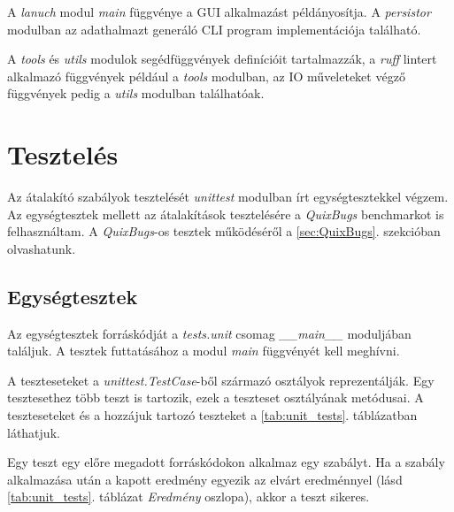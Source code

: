 A \emph{lanuch} modul \emph{main} függvénye a GUI alkalmazást példányosítja.
A \emph{persistor} modulban az adathalmazt generáló CLI program implementációja található.

A \emph{tools} és \emph{utils} modulok segédfüggvények definícióit tartalmazzák,
a \emph{ruff} lintert alkalmazó függvények például a \emph{tools} modulban,
az IO műveleteket végző függvények pedig a \emph{utils} modulban találhatóak.

\pagebreak

\section{Tesztelés}

Az átalakító szabályok tesztelését \emph{unittest} modulban írt egységtesztekkel végzem.
Az egységtesztek mellett az átalakítások tesztelésére a \emph{QuixBugs}
benchmarkot \cite{QuixBugs} is felhasználtam.
A \emph{QuixBugs}-os tesztek működéséről a \ref{sec:QuixBugs}. szekcióban olvashatunk.

\subsection{Egységtesztek}

Az egységtesztek forráskódját a \emph{tests.unit} csomag \emph{\_\_main\_\_}
moduljában találjuk. A tesztek futtatásához a modul \emph{main} függvényét kell meghívni.

A teszteseteket a \emph{unittest.TestCase}-ből származó osztályok reprezentálják.
Egy tesztesethez több teszt is tartozik, ezek a teszteset osztályának metódusai.
A teszteseteket és a hozzájuk tartozó teszteket a \ref{tab:unit_tests}. táblázatban láthatjuk.

Egy teszt egy előre megadott forráskódokon alkalmaz egy szabályt.
Ha a szabály alkalmazása után a kapott eredmény egyezik az elvárt eredménnyel
(lásd \ref{tab:unit_tests}. táblázat \emph{Eredmény} oszlopa), akkor a teszt sikeres.


